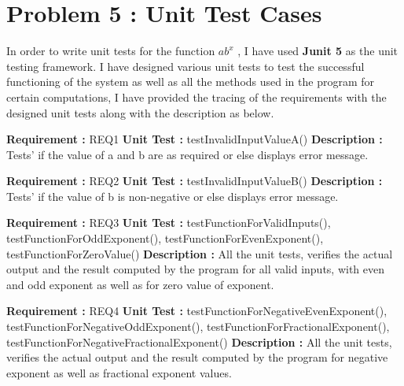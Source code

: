 \documentclass[12pt, a4paper]{article}
\begin{document}
\newpage
\section{Problem 5 : Unit Test Cases }
In order to write unit tests for the function $ab^x$ , I have used \textbf{Junit 5} \cite{JUnit5} as the unit testing framework. I have designed various unit tests to test the successful functioning of the system as well as all the methods used in the program for certain computations, I have provided the tracing of the requirements with the designed unit tests along with the description as below.  
\newline
    
\noindent
\textbf{Requirement : }  REQ1 
    \newline
    \textbf{Unit Test : } testInvalidInputValueA()
    \newline
    \textbf{Description :} Tests' if the value of a and b are as required or else displays error message.
    \newline
    
\noindent
\textbf{Requirement : }  REQ2
      \newline
    \textbf{Unit Test : } testInvalidInputValueB()
      \newline
    \textbf{Description :} Tests' if the value of b is non-negative or else displays error message.
    \newline
    
\noindent
\textbf{Requirement : }  REQ3
      \newline
    \textbf{Unit Test : } testFunctionForValidInputs(), 
    testFunctionForOddExponent(), \newline
    testFunctionForEvenExponent(),
    testFunctionForZeroValue()	
      \newline
    \textbf{Description :} All the unit tests, verifies the actual output and the result computed by the program for all valid inputs, with even and odd exponent as well as for zero value of exponent.
      \newline
    
\noindent
\textbf{Requirement : }  REQ4
      \newline
    \textbf{Unit Test : } testFunctionForNegativeEvenExponent(), \newline
    testFunctionForNegativeOddExponent(),
    testFunctionForFractionalExponent(), \newline
    testFunctionForNegativeFractionalExponent()
      \newline
    \textbf{Description :} All the unit tests, verifies the actual output and the result computed by the program for negative exponent as well as fractional exponent values.
      \newline
     
\end{document}
